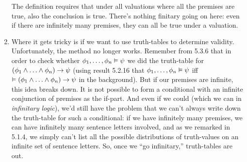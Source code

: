 \begin{enumerate}[\thesection.1]
\begin{itemize}
		\end{itemize}
		The definition requires that under all valuations where all the premises are true, also the conclusion is true. There's nothing finitary going on here: even if there are infinitely many premises, they can all be true under a valuation.
		
	  \item Where it gets tricky is if we want to use truth-tables to determine validity.
		Unfortunately, the method no longer works.
		Remember from 5.3.6 that in order to check whether
		$\phi_1,\mathellipsis, \phi_n\vDash \psi$
		we did the truth-table for $(\phi_1\land\mathellipsis\land\phi_n)\to\psi$
		(using result 5.2.16 that
		$\phi_1,\mathellipsis, \phi_n\vDash \psi$
		iff
		$\vDash (\phi_1\land\mathellipsis\land\phi_n)\to\psi$
		in the background).
		But if our premises are infinite, this idea breaks down.
		It is not possible to form a conditional with an infinite conjunction of premises as the if-part.
		And even if we could (which we can in \emph{infinitary logic}),
		we'd still have the problem that we can't always write down the truth-table for such a conditional:
		if we have infinitely many premises, we can have infinitely many sentence letters involved, and as we remarked in 5.1.4,
		we simply can't list all the possible distributions of truth-values on an infinite set of sentence letters.
		So, once we ``go infinitary,'' truth-tables are out.
		

\end{enumerate}
